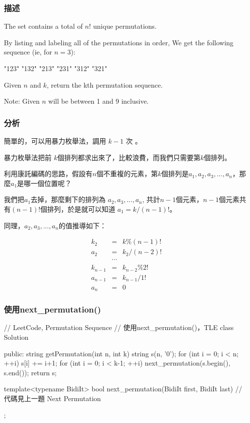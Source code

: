 \subsubsection{描述}
The set \fn{[1,2,3,…,n]} contains a total of $n!$ unique permutations.

By listing and labeling all of the permutations in order,
We get the following sequence (ie, for $n = 3$):
\begin{Code}
"123"
"132"
"213"
"231"
"312"
"321"
\end{Code}

Given $n$ and $k$, return the kth permutation sequence.

Note: Given $n$ will be between 1 and 9 inclusive.


\subsubsection{分析}
簡單的，可以用暴力枚舉法，調用 $k-1$ 次 。

暴力枚舉法把前 $k$個排列都求出來了，比較浪費，而我們只需要第$k$個排列。

利用康託編碼的思路，假設有$n$個不重複的元素，第$k$個排列是$a_1, a_2, a_3, ..., a_n$，那麼$a_1$是哪一個位置呢？

我們把$a_1$去掉，那麼剩下的排列為
$a_2, a_3, ..., a_n$, 共計$n-1$個元素，$n-1$個元素共有$(n-1)!$個排列，於是就可以知道 $a_1 = k / (n-1)!$。

同理，$a_2, a_3, ..., a_n$的值推導如下：

\begin{eqnarray}
k_2 &=& k\%(n-1)! \nonumber \\
a_2 &=& k_2/(n-2)! \nonumber \\
\quad & \cdots \nonumber \\
k_{n-1} &=& k_{n-2}\%2! \nonumber \\
a_{n-1} &=& k_{n-1}/1! \nonumber \\
a_n &=& 0 \nonumber
\end{eqnarray}


\subsubsection{使用next_permutation()}
\begin{Code}
// LeetCode, Permutation Sequence
// 使用next_permutation()，TLE
class Solution {
public:
    string getPermutation(int n, int k) {
        string s(n, '0');
        for (int i = 0; i < n; ++i)
            s[i] += i+1;
        for (int i = 0; i < k-1; ++i)
            next_permutation(s.begin(), s.end());
        return s;
    }

    template<typename BidiIt>
    bool next_permutation(BidiIt first, BidiIt last) {
        // 代碼見上一題 Next Permutation
    }
};
\end{Code}


